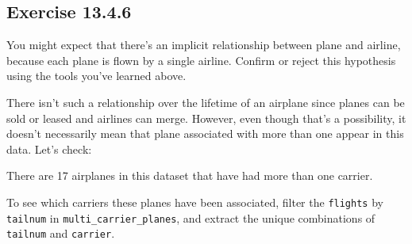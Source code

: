 \documentclass[]{book}
\newenvironment{Shaded}{\begin{snugshade}}{\end{snugshade}}
\newcommand{\CommentTok}[1]{\textcolor[rgb]{0.56,0.35,0.01}{\textit{#1}}}
\newcommand{\DecValTok}[1]{\textcolor[rgb]{0.00,0.00,0.81}{#1}}
\newcommand{\KeywordTok}[1]{\textcolor[rgb]{0.13,0.29,0.53}{\textbf{#1}}}
\newcommand{\NormalTok}[1]{#1}
\newcommand{\OperatorTok}[1]{\textcolor[rgb]{0.81,0.36,0.00}{\textbf{#1}}}
\newcommand{\StringTok}[1]{\textcolor[rgb]{0.31,0.60,0.02}{#1}}
\theoremstyle{plain}
\theoremstyle{remark}
\begin{document}
\hypertarget{exercise-13.4.6}{%
\subsection*{\texorpdfstring{Exercise
{13.4.6}}{Exercise 13.4.6}}\label{exercise-13.4.6}}

You might expect that there's an implicit relationship between plane and
airline, because each plane is flown by a single airline. Confirm or
reject this hypothesis using the tools you've learned above.

There isn't such a relationship over the lifetime of an airplane since
planes can be sold or leased and airlines can merge. However, even
though that's a possibility, it doesn't necessarily mean that plane
associated with more than one appear in this data. Let's check:

\begin{Shaded}
\end{Shaded}

There are 17 airplanes in this dataset that have had more than one
carrier.

To see which carriers these planes have been associated, filter the
\texttt{flights} by \texttt{tailnum} in \texttt{multi\_carrier\_planes},
and extract the unique combinations of \texttt{tailnum} and
\texttt{carrier}.
\end{document}
